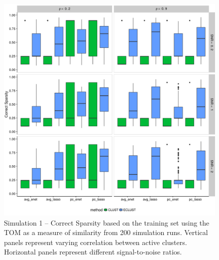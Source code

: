 \begin{figure}[H]
	\centering
	\includegraphics[scale=0.6, keepaspectratio]{./figs/hydra/results/figures/sim1-sept10/CorrectSparsity_TOM_sim1.png}
	\caption{Simulation 1 -- Correct Sparsity based on the training set using the TOM as a measure of similarity from 200 simulation runs. Vertical panels represent varying correlation between active clusters. Horizontal panels represent different signal-to-noise ratios.}
	\label{fig:CorrectSparsity_TOM_sim1}
\end{figure}


